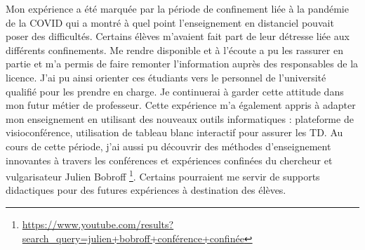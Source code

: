 Mon expérience a été marquée par la période de confinement liée à la pandémie de la COVID qui a montré à quel point l'enseignement en distanciel pouvait poser des difficultés. Certains élèves m'avaient fait part de leur détresse liée aux différents confinements. Me rendre disponible et à l'écoute a pu les rassurer en partie et m'a permis de faire remonter l'information auprès des responsables de la licence. J'ai pu ainsi orienter ces étudiants vers le personnel de l'université qualifié pour les prendre en charge. Je continuerai à garder cette attitude dans mon futur métier de professeur. Cette expérience m'a également appris à adapter mon enseignement en utilisant des nouveaux outils informatiques : plateforme de visioconférence, utilisation de tableau blanc interactif pour assurer les TD. Au cours de cette période, j'ai aussi pu découvrir des méthodes d'enseignement innovantes à travers les conférences et expériences confinées du chercheur et vulgarisateur Julien Bobroff \footnote{\url{https://www.youtube.com/results?search_query=julien+bobroff+conférence+confinée}}. Certains pourraient me servir de supports didactiques pour des futures expériences à destination des élèves.\\

